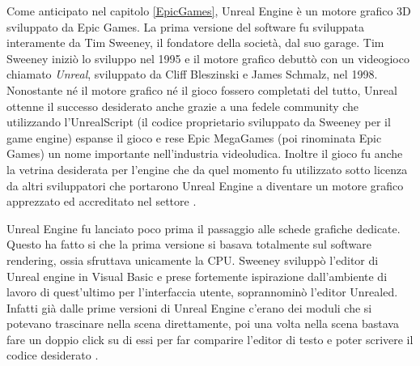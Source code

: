 Come anticipato nel capitolo \ref{EpicGames}, Unreal Engine è un motore grafico 3D sviluppato da Epic Games.
%
La prima versione del software fu sviluppata interamente da Tim Sweeney, il fondatore della società, dal suo garage. Tim Sweeney iniziò lo sviluppo nel 1995 e il motore grafico debuttò con un videogioco chiamato \textit{Unreal}, sviluppato da Cliff Bleszinski e James Schmalz, nel 1998.
%
Nonostante né il motore grafico né il gioco fossero completati del tutto, Unreal ottenne il successo desiderato anche grazie a una fedele community che utilizzando l'UnrealScript (il codice proprietario sviluppato da Sweeney per il game engine) espanse il gioco e rese Epic MegaGames (poi rinominata Epic Games) un nome importante nell'industria videoludica.
%
Inoltre il gioco fu anche la vetrina desiderata per l'engine che da quel momento fu utilizzato sotto licenza da altri sviluppatori che portarono Unreal Engine a diventare un motore grafico apprezzato ed accreditato nel settore \cite{PolygonUnreal, UHistory}.
%
%

Unreal Engine fu lanciato poco prima il passaggio alle schede grafiche dedicate.
%
Questo ha fatto si che la prima versione si basava totalmente sul software rendering, ossia sfruttava unicamente la CPU. 
%
Sweeney sviluppò l'editor di Unreal engine in Visual Basic e prese fortemente ispirazione dall'ambiente di lavoro di quest'ultimo per l'interfaccia utente, soprannominò l'editor Unrealed.
%
Infatti già dalle prime versioni di Unreal Engine c'erano dei moduli che si potevano trascinare nella scena direttamente, poi una volta nella scena bastava fare un doppio click su di essi per far comparire l'editor di testo e poter scrivere il codice desiderato \cite{InterviewSweeney}.

